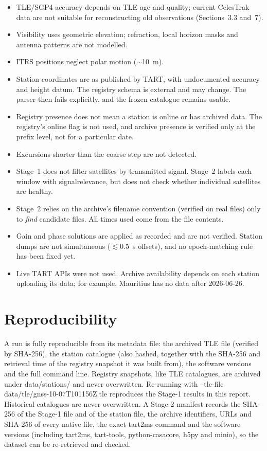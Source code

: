 \documentclass[11pt,a4paper]{article}
\newcommand{\code}[1]{{\ttfamily\def\_{\textunderscore\allowbreak}#1}}
\begin{document}
\begin{itemize}
\item TLE/SGP4 accuracy depends on TLE age and quality; current CelesTrak
data are not suitable for reconstructing old observations
(Sections~3.3 and~7).
\item Visibility uses geometric elevation; refraction, local horizon masks
and antenna patterns are not modelled.
\item ITRS positions neglect polar motion ($\sim$\SI{10}{\metre}).
\item Station coordinates are as published by TART, with undocumented
accuracy and height datum. The registry schema is external and may change.
The parser then fails explicitly, and the frozen catalogue remains usable.
\item Registry presence does not mean a station is online or has archived
data. The registry's \code{online} flag is not used, and archive presence
is verified only at the prefix level, not for a particular date.
\item Excursions shorter than the coarse step are not detected.
\item Stage~1 does not filter satellites by transmitted signal. Stage~2
labels each window with \code{signal\_relevance}, but does not check
whether individual satellites are healthy.
\item Stage~2 relies on the archive's filename convention (verified on real
files) only to \emph{find} candidate files. All times used come from the
file contents.
\item Gain and phase solutions are applied as recorded and are not
verified. Station dumps are not simultaneous ($\lesssim$\SI{0.5}{\second}
offsets), and no epoch-matching rule has been fixed yet.
\item Live TART APIs were not used. Archive availability depends on each
station uploading its data; for example, Mauritius has no data after
2026-06-26.
\end{itemize}

\section{Reproducibility}

A run is fully reproducible from its metadata file: the archived TLE file
(verified by SHA-256), the station catalogue (also hashed, together with the
SHA-256 and retrieval time of the registry snapshot it was built from), the
software versions and the full command line. Registry snapshots, like TLE
catalogues, are archived under \code{data/stations/} and never overwritten. Re-running with
\code{--tle-file data/tle/gnss\_2026-10-07T101156Z.tle} reproduces the
Stage-1 results in this report. Historical catalogues are never
overwritten. A Stage-2 manifest records the SHA-256 of the Stage-1 file and
of the station file, the archive identifiers, URLs and SHA-256 of every
native file, the exact \code{tart2ms} command and the software versions
(including \code{tart2ms}, \code{tart-tools}, python-casacore, \code{h5py}
and \code{minio}), so the dataset can be re-retrieved and checked.
\end{document}
